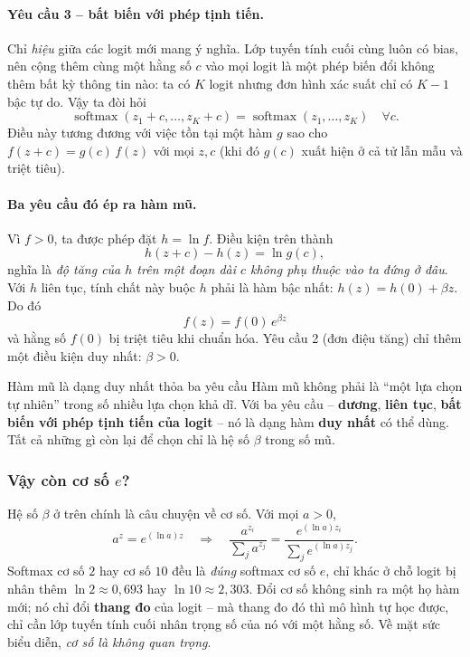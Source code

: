 \paragraph{Yêu cầu 3 -- bất biến với phép tịnh tiến.} Chỉ \emph{hiệu} giữa các logit mới mang ý nghĩa. Lớp tuyến tính cuối cùng luôn có bias, nên cộng thêm cùng một hằng số $c$ vào mọi logit là một phép biến đổi không thêm bất kỳ thông tin nào: ta có $K$ logit nhưng đơn hình xác suất chỉ có $K-1$ bậc tự do. Vậy ta đòi hỏi
\[
\operatorname{softmax}(z_1 + c, \dots, z_K + c) = \operatorname{softmax}(z_1, \dots, z_K) \quad \forall c .
\]
Điều này tương đương với việc tồn tại một hàm $g$ sao cho $f(z + c) = g(c)\, f(z)$ với mọi $z, c$ (khi đó $g(c)$ xuất hiện ở cả tử lẫn mẫu và triệt tiêu).

\paragraph{Ba yêu cầu đó ép ra hàm mũ.} Vì $f > 0$, ta được phép đặt $h = \ln f$. Điều kiện trên thành
\[
h(z + c) - h(z) = \ln g(c),
\]
nghĩa là \emph{độ tăng của $h$ trên một đoạn dài $c$ không phụ thuộc vào ta đứng ở đâu}. Với $h$ liên tục, tính chất này buộc $h$ phải là hàm bậc nhất: $h(z) = h(0) + \beta z$. Do đó
\[
\boxed{\,f(z) = f(0)\, e^{\beta z}\,}
\]
và hằng số $f(0)$ bị triệt tiêu khi chuẩn hóa. Yêu cầu 2 (đơn điệu tăng) chỉ thêm một điều kiện duy nhất: $\beta > 0$.

\begin{keyidea}{Hàm mũ là dạng duy nhất thỏa ba yêu cầu}
Hàm mũ không phải là “một lựa chọn tự nhiên” trong số nhiều lựa chọn khả dĩ. Với ba yêu cầu -- \textbf{dương}, \textbf{liên tục}, \textbf{bất biến với phép tịnh tiến của logit} -- nó là dạng hàm \textbf{duy nhất} có thể dùng. Tất cả những gì còn lại để chọn chỉ là hệ số $\beta$ trong số mũ.
\end{keyidea}

\subsubsection{Vậy còn cơ số $e$?}
Hệ số $\beta$ ở trên chính là câu chuyện về cơ số. Với mọi $a > 0$,
\[
a^z = e^{(\ln a) z} \quad \Longrightarrow \quad \frac{a^{z_i}}{\sum_j a^{z_j}} = \frac{e^{(\ln a) z_i}}{\sum_j e^{(\ln a) z_j}} .
\]
Softmax cơ số $2$ hay cơ số $10$ đều là \emph{đúng} softmax cơ số $e$, chỉ khác ở chỗ logit bị nhân thêm $\ln 2 \approx 0{,}693$ hay $\ln 10 \approx 2{,}303$. Đổi cơ số không sinh ra một họ hàm mới; nó chỉ đổi \textbf{thang đo} của logit -- mà thang đo đó thì mô hình tự học được, chỉ cần lớp tuyến tính cuối nhân trọng số của nó với một hằng số. Về mặt sức biểu diễn, \emph{cơ số là không quan trọng}.

